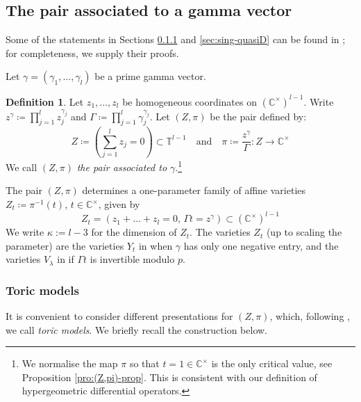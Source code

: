 \documentclass[11pt, reqno]{amsart}
\theoremstyle{plain}
\theoremstyle{definition}
\newtheorem{dfn}[thm]{Definition}
\newcommand{\CC}{\mathbb{C}}
\newcommand{\TT}{\mathbb{T}}
\begin{document}
\subsection{The pair associated to a gamma vector}
\label{sec:pair} 
Some of the statements in Sections \ref{sec:toric-models} and \ref{sec:sing-quasiD} can be found in \cite[Section 3, Section 1.3]{RV, GGFRV}; for completeness, we supply their proofs.


Let $\gamma=(\gamma_1, \dots, \gamma_l)$ be a prime gamma vector. 

\begin{dfn}
Let $z_1, \dots, z_l$ be homogeneous coordinates  on $(\CC^\times)^{l-1}$. Write $z^\gamma\coloneqq \prod_{j=1}^lz_j^{\gamma_j}$ and $\Gamma \coloneqq \prod_{j=1}^l \gamma_j^{\gamma_j}$.
Let $(Z, \pi)$ be the pair defined by: 
\begin{equation}
\label{eq:Z-pi} Z\coloneqq\left(\sum_{j=1}^l z_j=0\right) \subset \TT^{l-1}
\quad \text{and} \quad \pi\coloneqq \frac{z^\gamma }{\Gamma } \colon Z \to \CC^\times
\end{equation}
We call $(Z, \pi)$ \emph{the pair associated to $\gamma$}.\footnote{We normalise the map $\pi$ so that $t=1 \in \CC^\times$ is the only critical value, see Proposition \ref{pro:(Z,pi)-prop}. This is consistent with our definition of hypergeometric differential operators.} 
\end{dfn}
\smallskip

The pair $(Z, \pi)$ determines a one-parameter family of affine varieties $Z_t\coloneqq \pi^{-1}(t)$, $t \in \CC^\times$, given by
\begin{equation}
   Z_t=\left( z_1+\dots + z_l=0, \, \Gamma t= z^\gamma  \right) \subset (\CC^\times)^{l-1}
\end{equation} 
We write $\kappa:=l-3$ for the dimension of $Z_t$.
The varieties $Z_t$  (up to scaling the parameter) are the varieties $Y_t$ in \cite[Equation (2)]{AG} when $\gamma$ has only one negative entry, and the varieties $V_\lambda$ in \cite[Equation (1.1)]{BCM} if $\Gamma t$ is invertible modulo $p$.  

\subsubsection{Toric models} 
\label{sec:toric-models}
It is convenient to consider different presentations for $(Z, \pi)$, which, following \cite[$\S 4$]{RV}, we call  \emph{toric models}. We briefly recall the construction below.
\end{document}
